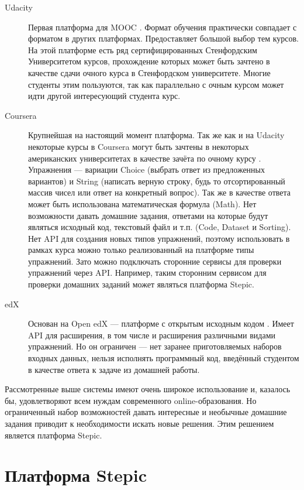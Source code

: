 \documentclass{matmex-diploma-custom}
\begin{document}
\begin{description}
\item[Udacity] Первая платформа для MOOC \cite{udacity}. Формат
  обучения практически совпадает с форматом в других
  платформах. Предоставляет большой выбор тем курсов. На этой
  платформе есть ряд сертифицированных Стенфордским Университетом
  курсов, прохождение которых может быть зачтено в качестве сдачи
  очного курса в Стенфордском университете. Многие студенты этим
  пользуются, так как параллельно с очным курсом может идти другой
  интересующий студента курс.
\item[Coursera] Крупнейшая на настоящий момент платформа. Так же как и
  на Udacity некоторые курсы в Coursera могут быть зачтены в некоторых
  американских университетах в качестве зачёта по очному курсу
  \cite{coursera}. Упражнения --- вариации Choice (выбрать ответ из
  предложенных вариантов) и String (написать верную строку, будь то
  отсортированный массив чисел или ответ на конкретный вопрос). Так же
  в качестве ответа может быть использована математическая формула
  (Math). Нет возможности давать домашние задания, ответами на которые
  будут являться исходный код, текстовый файл и т.п. (Code, Dataset и
  Sorting). Нет API для создания новых типов упражнений, поэтому
  использовать в рамках курса можно только реализованный на платформе
  типы упражнений. Зато можно подключать сторонние сервисы для
  проверки упражнений через API. Например, таким сторонним сервисом
  для проверки домашних заданий может являться платформа Stepic.
\item[edX] Основан на Open edX --- платформе с открытым исходным кодом
  \cite{edx}. Имеет API для расширения, в том числе и расширения
  различными видами упражнений. Но он ограничен --- нет заранее
  приготовляемых наборов входных данных, нельзя исполнять программный
  код, введённый студентом в качестве ответа к задаче из домашней
  работы.
\end{description}

Рассмотренные выше системы имеют очень широкое использование и,
казалось бы, удовлетворяют всем нуждам современного
online-образования. Но ограниченный набор возможностей давать
интересные и необычные домашние задания приводит к необходимости
искать новые решения. Этим решением является платформа Stepic.

\section{Платформа Stepic}
\end{document}
